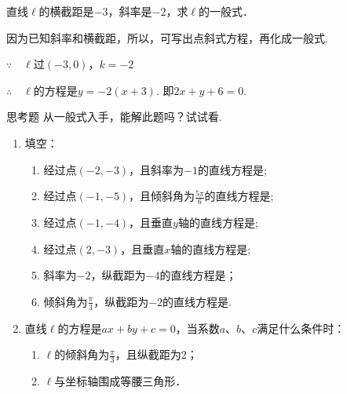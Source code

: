 \begin{example}
直线$\ell$的横截距是$-3$，斜率是$-2$，求$\ell$的一般式．
\end{example}

\begin{analyze}
    因为已知斜率和横截距，所以，可写出点斜式方程，再化成一般式.
\end{analyze}

\begin{solution}
$\because\quad \ell$过$(-3,0)$，$k=-2$

$\therefore\quad\ell$的方程是$y=-2(x+3)$. 
即$2x+y+6=0$.
\end{solution}

\begin{thm}
    {思考题} 从一般式入手，能解此题吗？试试看.
\end{thm}

\begin{ex}
\begin{enumerate}
    \item 填空：
\begin{enumerate}[(1)]
\item 经过点$(-2,-3)$，且斜率为$-1$的直线方程是\blank ;
\item 经过点$(-1,-5)$，且倾斜角为$\frac{5\pi}{6}$的直线方程是\blank ;
\item 经过点$(-1,-4)$，且垂直$y$轴的直线方程是\blank ;
\item 经过点$(2,-3)$，且垂直$x$轴的直线方程是\blank ;
\item 斜率为$-2$，纵截距为$-4$的直线方程是\blank；
\item 倾斜角为$\frac{\pi}{3}$，纵截距为$-2$的直线方程是\blank .
\end{enumerate}

    \item 直线$\ell$的方程是$ax+by+c=0$，当系数$a$、$b$、$c$满足什么条件时：
\begin{enumerate}[(1)]
    \item $\ell$的倾斜角为$\frac{\pi}{3}$，且纵截距为2；
    \item $\ell$与坐标轴围成等腰三角形．
\end{enumerate}
\end{enumerate}
\end{ex}

